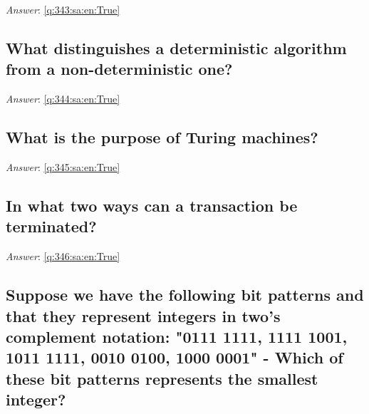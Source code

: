 \documentclass[a4paper,11pt,oneside]{article}
\begin{document}
\begin{sloppypar}
\textit{Answer}: \autoref{q:343:sa:en:True}



\subsection{What distinguishes a deterministic algorithm from a non-deterministic one?}

\label{q:344:sa:en:False}

\vspace{2cm}

\noindent\makebox[\textwidth]{\hrulefill}

\vspace{1cm}

\textit{Answer}: \autoref{q:344:sa:en:True}



\subsection{What is the purpose of Turing machines?}

\label{q:345:sa:en:False}

\vspace{2cm}

\noindent\makebox[\textwidth]{\hrulefill}

\vspace{1cm}

\textit{Answer}: \autoref{q:345:sa:en:True}



\subsection{In what two ways can a transaction be terminated?}

\label{q:346:sa:en:False}

\vspace{2cm}

\noindent\makebox[\textwidth]{\hrulefill}

\vspace{1cm}

\textit{Answer}: \autoref{q:346:sa:en:True}



\subsection{Suppose we have the following bit patterns and that they represent integers in two's complement notation: "0111 1111, 1111 1001, 1011 1111, 0010 0100, 1000 0001" - Which of these bit patterns represents the smallest integer?}


\end{sloppypar}
\end{document}
